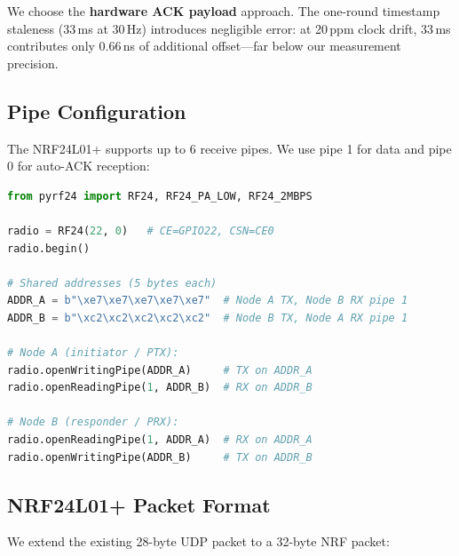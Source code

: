 \documentclass[11pt,a4paper]{article}
\begin{document}
We choose the \textbf{hardware ACK payload} approach. The one-round timestamp staleness (33\,ms at 30\,Hz) introduces negligible error: at 20\,ppm clock drift, 33\,ms contributes only 0.66\,ns of additional offset---far below our measurement precision.

\subsection{Pipe Configuration}

The NRF24L01+ supports up to 6 receive pipes. We use pipe 1 for data and pipe 0 for auto-ACK reception:

\begin{lstlisting}[language=Python]
from pyrf24 import RF24, RF24_PA_LOW, RF24_2MBPS

radio = RF24(22, 0)   # CE=GPIO22, CSN=CE0
radio.begin()

# Shared addresses (5 bytes each)
ADDR_A = b"\xe7\xe7\xe7\xe7\xe7"  # Node A TX, Node B RX pipe 1
ADDR_B = b"\xc2\xc2\xc2\xc2\xc2"  # Node B TX, Node A RX pipe 1

# Node A (initiator / PTX):
radio.openWritingPipe(ADDR_A)     # TX on ADDR_A
radio.openReadingPipe(1, ADDR_B)  # RX on ADDR_B

# Node B (responder / PRX):
radio.openReadingPipe(1, ADDR_A)  # RX on ADDR_A
radio.openWritingPipe(ADDR_B)     # TX on ADDR_B
\end{lstlisting}

\subsection{NRF24L01+ Packet Format}

We extend the existing 28-byte UDP packet to a 32-byte NRF packet:
\end{document}
